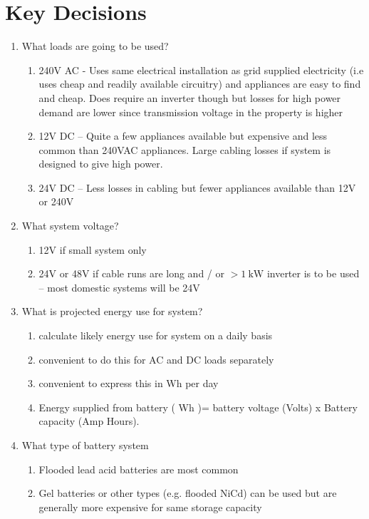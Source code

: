\documentclass[article]{standalone}
\begin{document}
\section{Key Decisions}\label{sec:KeyDecisions}
\begin{enumerate}
    \item What loads are going to be used?\begin{enumerate}
        \item	240V AC -  Uses same electrical installation as grid supplied electricity (i.e uses cheap and readily available circuitry) and appliances are easy to find and cheap. Does require an inverter though but losses for high power demand are lower since transmission voltage in the property is higher 
        \item	12V DC – Quite a few appliances available but expensive and less common than 240VAC appliances. Large cabling losses if system is designed to give high power.
        \item	24V DC – Less losses in cabling but fewer appliances available than 12V or 240V
    \end{enumerate}
    \item What system voltage?\begin{enumerate}
        \item	12V if small system only
        \item	24V or 48V if cable runs are long and / or $> \SI{1}{\kilo\watt}$ inverter is to be used – most domestic systems will be 24V
    \end{enumerate}
    \item What is projected energy use for system?\begin{enumerate}
        \item	calculate likely energy use for system on a daily basis
        \item	convenient to do this for AC and DC loads separately
        \item	convenient to express this in Wh per day
        \item	Energy supplied from battery ( Wh )= battery voltage (Volts) x Battery capacity (Amp Hours).
    \end{enumerate}
    \item What type of battery system\begin{enumerate}
        \item	Flooded lead acid batteries are most common 
        \item	Gel batteries or other types (e.g. flooded NiCd) can be used but are generally more expensive for same storage capacity

\end{enumerate}
\end{enumerate}
\end{document}
